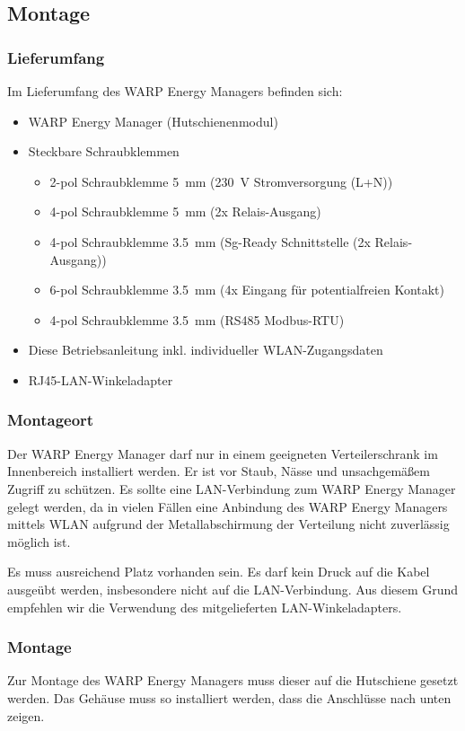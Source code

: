 \documentclass[a4paper,10pt]{article}
\begin{document}
\begin{multicols*}{2}
	\subsection{Montage}
	\subsubsection{Lieferumfang}
	Im Lieferumfang des WARP Energy Managers befinden sich:
	\begin{itemize}
		\item WARP Energy Manager (Hutschienenmodul)
		\item Steckbare Schraubklemmen
		\begin{itemize}
			\item 2-pol Schraubklemme \SI{5}{\milli\meter} (\SI{230}{\volt} Stromversorgung (L+N))
			\item 4-pol Schraubklemme \SI{5}{\milli\meter} (2x Relais-Ausgang)
			\item 4-pol Schraubklemme \SI{3.5}{\milli\meter} (Sg-Ready Schnittstelle (2x Relais-Ausgang))
			\item 6-pol Schraubklemme \SI{3.5}{\milli\meter} (4x Eingang für potentialfreien Kontakt)
			\item 4-pol Schraubklemme \SI{3.5}{\milli\meter} (RS485 Modbus-RTU)
		\end{itemize}
		\item Diese Betriebsanleitung inkl. individueller WLAN-Zugangsdaten
		\item RJ45-LAN-Winkeladapter
	\end{itemize}

	\subsubsection{Montageort}
	Der WARP Energy Manager darf nur in einem geeigneten Verteilerschrank im
	Innenbereich installiert werden. Er ist vor Staub, Nässe und unsachgemäßem
	Zugriff zu schützen. Es sollte
	eine LAN-Verbindung zum WARP Energy Manager gelegt werden, da in vielen
	Fällen eine Anbindung des WARP Energy Managers mittels WLAN aufgrund
	der Metallabschirmung der Verteilung nicht zuverlässig möglich ist.

	Es muss ausreichend Platz vorhanden sein. Es darf kein Druck auf die Kabel
	ausgeübt werden, insbesondere nicht auf die LAN-Verbindung. Aus diesem Grund
	empfehlen wir die Verwendung des mitgelieferten LAN-Winkeladapters.

	\subsubsection{Montage}
	Zur Montage des WARP Energy Managers muss dieser auf die Hutschiene
	gesetzt werden. Das Gehäuse muss so installiert werden, dass die Anschlüsse
	nach unten zeigen.


\end{multicols*}
\end{document}
